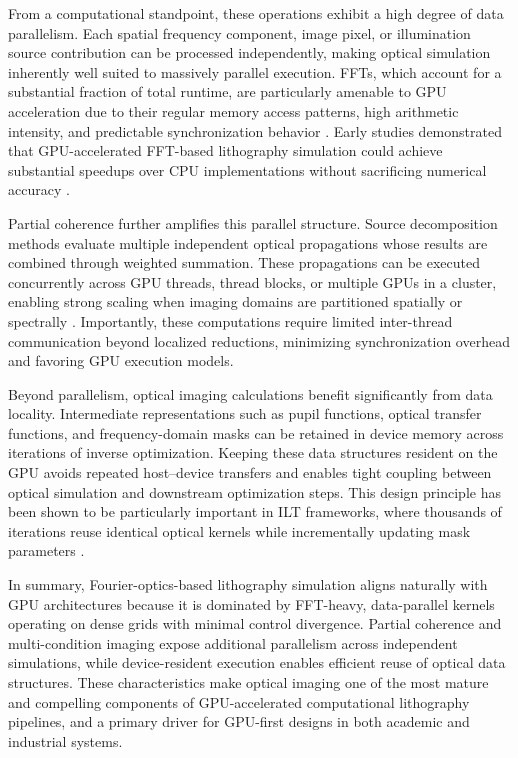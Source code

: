 \documentclass[pdflatex,sn-mathphys-num]{sn-jnl}%
\theoremstyle{thmstyleone}%
\theoremstyle{thmstyletwo}%
\theoremstyle{thmstylethree}%
\begin{document}
From a computational standpoint, these operations exhibit a high degree of data parallelism. Each spatial frequency component, image pixel, or illumination source contribution can be processed independently, making optical simulation inherently well suited to massively parallel execution. FFTs, which account for a substantial fraction of total runtime, are particularly amenable to GPU acceleration due to their regular memory access patterns, high arithmetic intensity, and predictable synchronization behavior \cite{Govindaraju08,Yang2025}. Early studies demonstrated that GPU-accelerated FFT-based lithography simulation could achieve substantial speedups over CPU implementations without sacrificing numerical accuracy \cite{Yang2025,Zheng2023}.

Partial coherence further amplifies this parallel structure. Source decomposition methods evaluate multiple independent optical propagations whose results are combined through weighted summation. These propagations can be executed concurrently across GPU threads, thread blocks, or multiple GPUs in a cluster, enabling strong scaling when imaging domains are partitioned spatially or spectrally \cite{Zheng2023}. Importantly, these computations require limited inter-thread communication beyond localized reductions, minimizing synchronization overhead and favoring GPU execution models.

Beyond parallelism, optical imaging calculations benefit significantly from data locality. Intermediate representations such as pupil functions, optical transfer functions, and frequency-domain masks can be retained in device memory across iterations of inverse optimization. Keeping these data structures resident on the GPU avoids repeated host–device transfers and enables tight coupling between optical simulation and downstream optimization steps. This design principle has been shown to be particularly important in ILT frameworks, where thousands of iterations reuse identical optical kernels while incrementally updating mask parameters \cite{Zheng2023}.

In summary, Fourier-optics-based lithography simulation aligns naturally with GPU architectures because it is dominated by FFT-heavy, data-parallel kernels operating on dense grids with minimal control divergence. Partial coherence and multi-condition imaging expose additional parallelism across independent simulations, while device-resident execution enables efficient reuse of optical data structures. These characteristics make optical imaging one of the most mature and compelling components of GPU-accelerated computational lithography pipelines, and a primary driver for GPU-first designs in both academic and industrial systems.
\end{document}
